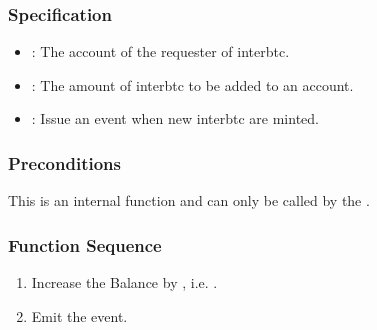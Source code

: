 \documentclass[a4paper,10pt,english]{sphinxmanual}
\begin{document}
\subsubsection{Specification}
\label{\detokenize{spec/treasury:id3}}


\begin{itemize}
\item {} 
: The account of the requester of interbtc.

\item {} 
: The amount of interbtc to be added to an account.

\end{itemize}

\begin{itemize}
\item {} 
: Issue an event when new interbtc are minted.

\end{itemize}



\subsubsection{Preconditions}
\label{\detokenize{spec/treasury:preconditions}}
This is an internal function and can only be called by the {\hyperref[\detokenize{spec/issue:issue-protocol}]{}}.


\subsubsection{Function Sequence}
\label{\detokenize{spec/treasury:id4}}\begin{enumerate}
%
\item {} 
Increase the  Balance by , i.e. .

\item {} 
Emit the  event.

\end{enumerate}
\end{document}
